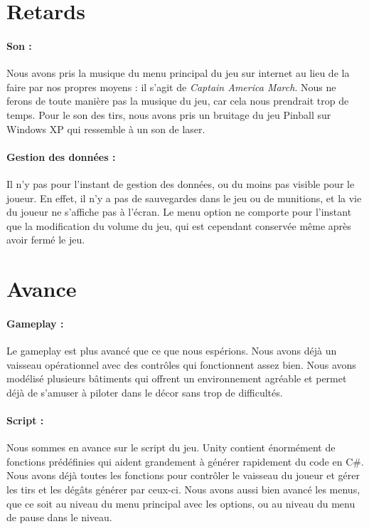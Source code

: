 \documentclass[10pt, titlepage]{report}
\begin{document}
\section{Retards}

\paragraph{Son :}
Nous avons pris la musique du menu principal du jeu sur internet au lieu de la faire par nos propres moyens : il s'agit de \textit{Captain America March}. Nous ne ferons de toute manière pas la musique du jeu, car cela nous prendrait trop de temps. Pour le son des tirs, nous avons pris un bruitage du jeu Pinball sur Windows XP qui ressemble à un son de laser.

\paragraph{Gestion des données :}
Il n'y pas pour l'instant de gestion des données, ou du moins pas visible pour le joueur. En effet, il n'y a pas de sauvegardes dans le jeu ou de munitions, et la vie du joueur ne s'affiche pas à l'écran. Le menu option ne comporte pour l'instant que la modification du volume du jeu, qui est cependant conservée même après avoir fermé le jeu.

\section{Avance}

\paragraph{Gameplay :}
Le gameplay est plus avancé que ce que nous espérions. Nous avons déjà un vaisseau opérationnel avec des contrôles qui fonctionnent assez bien. Nous avons modélisé plusieurs bâtiments qui offrent un environnement agréable et permet déjà de s'amuser à piloter dans le décor sans trop de difficultés.

\paragraph{Script :}
Nous sommes en avance sur le script du jeu. Unity contient énormément de fonctions prédéfinies qui aident grandement à générer rapidement du code en C\#. Nous avons déjà toutes les fonctions pour contrôler le vaisseau du joueur et gérer les tirs et les dégâts générer par ceux-ci. Nous avons aussi bien avancé les menus, que ce soit au niveau du menu principal avec les options, ou au niveau du menu de pause dans le niveau.
\end{document}
